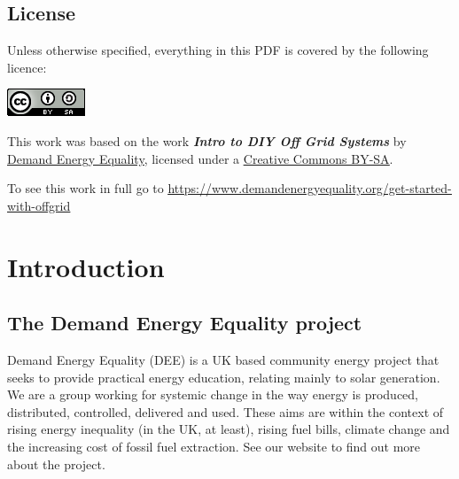 \documentclass{article}
\theoremstyle{definition}
\theoremstyle{definition}
\theoremstyle{remark}
\begin{document}

  {\color{blue}\subsection*{License}} %
  \label{sub:license}

    Unless otherwise specified, everything in this PDF is covered by the following licence:

    \includegraphics[]{../Images/image_0_2_(license).png} \newline

    This work was based on the work \textbf{\textit{Intro to DIY Off Grid Systems}} by \href{https://www.demandenergyequality.org/}{\underline{Demand Energy Equality}}, licensed under a \href{https://creativecommons.org/licenses/by-sa/4.0/legalcode}{\underline{Creative Commons BY-SA}}.

    To see this work in full go to \href{https://www.demandenergyequality.org/get-started-with-offgrid}{\underline{https://www.demandenergyequality.org/get-started-with-offgrid}}
  


\newpage

{\color{blue}\section{Introduction}} %
\label{sec:introduction}

  {\color{blue}\subsection{The Demand Energy Equality project}} %
  \label{sub:the_demand_energy_equality_project}

    Demand Energy Equality (DEE) is a UK based community energy project that seeks to provide practical energy education, relating mainly to solar generation. We are a group working for systemic change in the way energy is produced, distributed, controlled, delivered and used. These aims are within the context of rising energy inequality (in the UK, at least), rising fuel bills, climate change and the increasing cost of fossil fuel extraction. See our website to find out more about the project.
\end{document}

